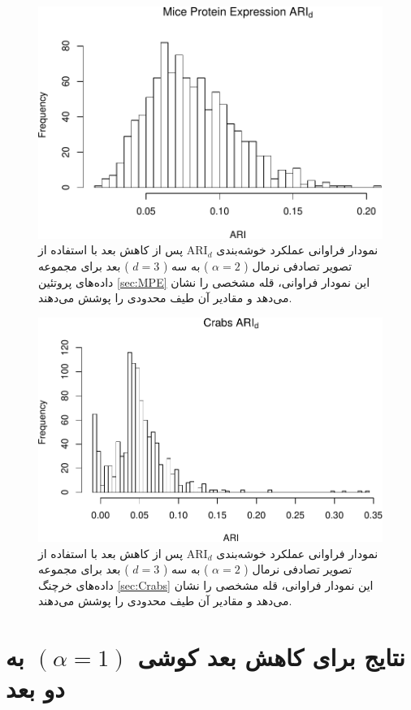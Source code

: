 \begin{figure}[H]
\centering
\includegraphics[width=0.7\linewidth]{Report_files/figure-latex/unnamed-chunk-6-6}
\caption{
نمودار فراوانی عملکرد خوشه‌بندی 
$\mathrm{ARI}_d$
پس از کاهش بعد با استفاده از تصویر تصادفی
نرمال (%
$\alpha=2$%
)
به سه (%
$d=3$%
)
بعد برای مجموعه داده‌های
پروتئین
\ref{sec:MPE}
این نمودار فراوانی،
قله
مشخصی را نشان 
می‌دهد
و مقادیر آن طیف 
محدودی
 را پوشش می‌دهند.
}
\end{figure}

\begin{figure}[H]
\centering
\includegraphics[width=0.7\linewidth]{Report_files/figure-latex/unnamed-chunk-6-7}
\caption{
نمودار فراوانی عملکرد خوشه‌بندی 
$\mathrm{ARI}_d$
پس از کاهش بعد با استفاده از تصویر تصادفی
نرمال (%
$\alpha=2$%
)
به سه (%
$d=3$%
)
بعد برای مجموعه داده‌های
خرچنگ
\ref{sec:Crabs}
این نمودار فراوانی،
قله
مشخصی را نشان 
می‌دهد
و مقادیر آن طیف 
محدودی
 را پوشش می‌دهند.
}
\end{figure}








\section{
نتایج برای کاهش بعد کوشی 
$(\alpha = 1)$
به دو بعد
}
\label{sec:A1D2}

